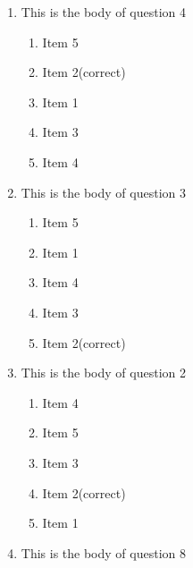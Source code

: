 \documentclass[amsfonts,bezier,leqno,fleqn,12pt,a4paper]{article}
\begin{document}
{{\begin{large}
\begin{enumerate}
\begin{enumerate}
\item  Item 3
\item  Item 5
\item  Item 4
\item  Item 2\hfill {\small (correct)}
\item  Item 1

\end{enumerate}
\newpage


\item This is the body of question 4
\vspace {0.3in}
\setcounter{equation}{0}

\begin{enumerate}
\item  Item 5
\item  Item 2\hfill {\small (correct)}
\item  Item 1
\item  Item 3
\item  Item 4

\end{enumerate}

\vspace {3.5cm}


\item This is the body of question 3
\vspace {0.3in}
\setcounter{equation}{0}

\begin{enumerate}
\item  Item 5
\item  Item 1
\item  Item 4
\item  Item 3
\item  Item 2\hfill {\small (correct)}

\end{enumerate}
\newpage


\item This is the body of question 2
\vspace {0.3in}
\setcounter{equation}{0}

\begin{enumerate}
\item  Item 4
\item  Item 5
\item  Item 3
\item  Item 2\hfill {\small (correct)}
\item  Item 1

\end{enumerate}

\vspace {3.5cm}


\item This is the body of question 8
\vspace {0.3in}
\setcounter{equation}{0}


\end{enumerate}
\end{large}}}
\end{document}
